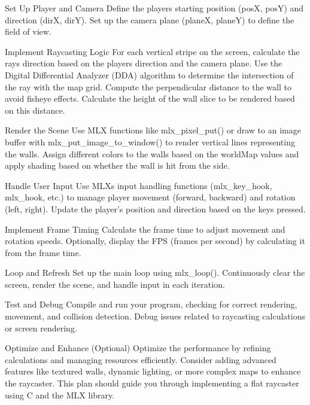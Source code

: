 \begin{DoxyEnumerate}
\item Set Up Player and Camera Define the player\textquotesingle{}s starting position (posX, posY) and direction (dirX, dirY). Set up the camera plane (planeX, planeY) to define the field of view.
\item Implement Raycasting Logic For each vertical stripe on the screen, calculate the ray\textquotesingle{}s direction based on the player\textquotesingle{}s direction and the camera plane. Use the Digital Differential Analyzer (DDA) algorithm to determine the intersection of the ray with the map grid. Compute the perpendicular distance to the wall to avoid fisheye effects. Calculate the height of the wall slice to be rendered based on this distance.
\item Render the Scene Use MLX functions like mlx\+\_\+pixel\+\_\+put() or draw to an image buffer with mlx\+\_\+put\+\_\+image\+\_\+to\+\_\+window() to render vertical lines representing the walls. Assign different colors to the walls based on the world\+Map values and apply shading based on whether the wall is hit from the side.
\item Handle User Input Use MLX\textquotesingle{}s input handling functions (mlx\+\_\+key\+\_\+hook, mlx\+\_\+hook, etc.) to manage player movement (forward, backward) and rotation (left, right). Update the player’s position and direction based on the keys pressed.
\item Implement Frame Timing Calculate the frame time to adjust movement and rotation speeds. Optionally, display the FPS (frames per second) by calculating it from the frame time.
\item Loop and Refresh Set up the main loop using mlx\+\_\+loop(). Continuously clear the screen, render the scene, and handle input in each iteration.
\item Test and Debug Compile and run your program, checking for correct rendering, movement, and collision detection. Debug issues related to raycasting calculations or screen rendering.
\item Optimize and Enhance (Optional) Optimize the performance by refining calculations and managing resources efficiently. Consider adding advanced features like textured walls, dynamic lighting, or more complex maps to enhance the raycaster. This plan should guide you through implementing a flat raycaster using C and the MLX library. 
\end{DoxyEnumerate}